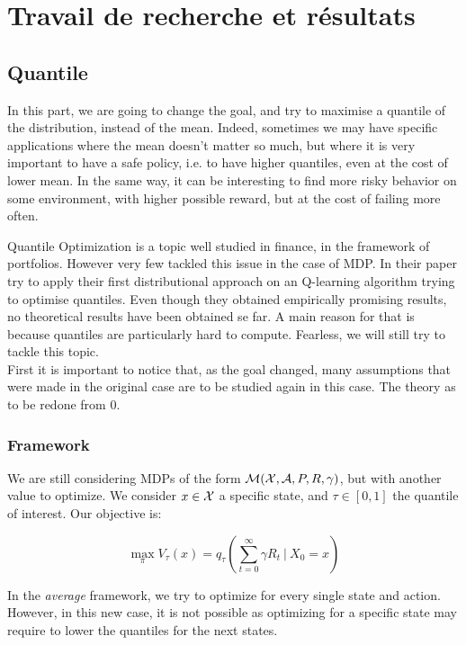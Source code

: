 \section{Travail de recherche et résultats}

\subsection{Quantile}
In this part, we are going to change the goal, and try to maximise a quantile of the distribution, instead of the mean. Indeed, sometimes we may have specific applications where the mean doesn’t matter so much, but where it is very important to have a safe policy, i.e. to have higher quantiles, even at the cost of lower mean. In the same way, it can be interesting to find more risky behavior on some environment, with higher possible reward, but at the cost of failing more often. 

Quantile Optimization is a topic well studied in finance, in the framework of portfolios. However very few tackled this issue in the case of MDP. In their paper \cite[Morimura et al.]{morimura_parametric_2012} try to apply their first distributional approach on an Q-learning algorithm trying to optimise quantiles. Even though they obtained empirically promising results, no theoretical results have been obtained se far. A main reason for that is because quantiles are particularly hard to compute. Fearless, we will still try to tackle this topic.\\

First it is important to notice that, as the goal changed, many assumptions that were made in the original case are to be studied again in this case. The theory as to be redone from 0.


\subsubsection*{Framework}

We are still considering MDPs of the form $\mathcal{M}(\mathcal{X},\mathcal{A}, P,R, \gamma)$, but with another value to optimize. We consider $x \in \mathcal{X}$ a specific state, and $\tau \in [0,1]$ the quantile of interest. Our objective is:

    \[\max_\pi V_\tau(x) = q_\tau\left(\sum_{t = 0}^{\infty} \gamma R_t \ |\ X_0 = x\right) \]

In the \emph{average} framework, we try to optimize for every single state and action. However, in this new case, it is not possible as optimizing for a specific state may require to lower the quantiles for the next states.

